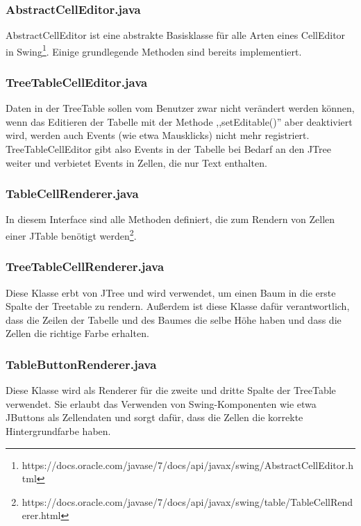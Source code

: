 \subsubsection*{AbstractCellEditor.java}
AbstractCellEditor ist eine abstrakte Basisklasse für alle Arten eines CellEditor in Swing\footnote{https://docs.oracle.com/javase/7/docs/api/javax/swing/AbstractCellEditor.html}. Einige grundlegende Methoden sind bereits implementiert.

\subsubsection*{TreeTableCellEditor.java}
Daten in der TreeTable sollen vom Benutzer zwar nicht verändert werden können, wenn das Editieren der Tabelle mit der Methode ,,setEditable()'' aber deaktiviert wird, werden auch Events (wie etwa Mausklicks) nicht mehr registriert. TreeTableCellEditor gibt also Events in der Tabelle bei Bedarf an den JTree weiter und verbietet Events in Zellen, die nur Text enthalten.

\subsubsection*{TableCellRenderer.java}
In diesem Interface sind alle Methoden definiert, die zum Rendern von Zellen einer JTable benötigt werden\footnote{https://docs.oracle.com/javase/7/docs/api/javax/swing/table/TableCellRenderer.html}.

\subsubsection*{TreeTableCellRenderer.java}
Diese Klasse erbt von JTree und wird verwendet, um einen Baum in die erste Spalte der Treetable zu rendern. Außerdem ist diese Klasse dafür verantwortlich, dass die Zeilen der Tabelle und des Baumes die selbe Höhe haben und dass die Zellen die richtige Farbe erhalten.

\subsubsection*{TableButtonRenderer.java}
Diese Klasse wird als Renderer für die zweite und dritte Spalte der TreeTable verwendet. Sie erlaubt das Verwenden von Swing-Komponenten wie etwa JButtons als Zellendaten und sorgt dafür, dass die Zellen die korrekte Hintergrundfarbe haben.

